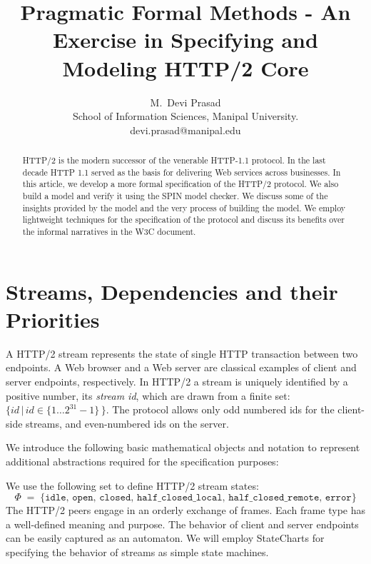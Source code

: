 \documentclass[10pt]{article}
\begin{document}
\title{Pragmatic Formal Methods - An Exercise in Specifying and Modeling HTTP/2 Core}
\author{
  M.\, Devi Prasad\\
  School of Information Sciences, Manipal University.\vspace*{6pt}\\
  devi.prasad@manipal.edu
 }
\date{}
\maketitle

\begin{abstract}
HTTP/2 is the modern successor of the venerable HTTP-1.1 protocol. In the last decade HTTP 1.1 served as the basis for delivering Web services across businesses. In this article, we develop a more formal specification of the HTTP/2 protocol. We also build a model and verify it using the SPIN model checker. We discuss some of the insights provided by the model and the very process of building the model. We employ lightweight techniques for the specification of the protocol and discuss its benefits over the informal narratives in the W3C document.
\end{abstract}

\section{Streams, Dependencies and their Priorities}
A HTTP/2 stream represents the state of single HTTP transaction between two endpoints. A Web browser and a Web server are classical examples of client and server endpoints, respectively. In HTTP/2 a stream is uniquely identified by a positive number, its \emph{stream id}, which are drawn from a finite set: $\{id \,| \,id \in \{1 \ldots 2^{31}-1\} \,\}$.  The protocol allows only odd numbered ids for the client-side streams, and even-numbered ids on the server.  

We introduce the following basic mathematical objects and notation to represent additional abstractions required for the specification purposes:

 We use the following set to define HTTP/2 stream states:
\[
\Phi \; = \; \{ \mathtt{idle}, \, \mathtt{open}, \, \mathtt{closed}, \, \mathtt{half\_closed\_local}, \, \mathtt{half\_closed\_remote}, \, \mathtt{error}\}
\]
The HTTP/2 peers engage in an orderly exchange of frames. Each frame type has a well-defined meaning and purpose. The behavior of client and server endpoints can be easily captured as an automaton. We will employ StateCharts for specifying the behavior of streams as simple state machines. 
\end{document}

